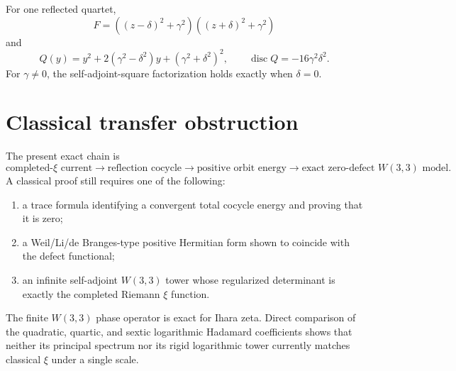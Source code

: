 For one reflected quartet,
\[
 F=((z-\delta)^2+\gamma^2)((z+\delta)^2+\gamma^2)
\]
and
\[
 Q(y)=y^2+2(\gamma^2-\delta^2)y+(\gamma^2+\delta^2)^2,
 \qquad
 \operatorname{disc}Q=-16\gamma^2\delta^2.
\]
For $\gamma\ne0$, the self-adjoint-square factorization holds exactly when
$\delta=0$.

\section{Classical transfer obstruction}

The present exact chain is
\[
 \text{completed-}\xi\text{ current}
 \longrightarrow
 \text{reflection cocycle}
 \longrightarrow
 \text{positive orbit energy}
 \longrightarrow
 \text{exact zero-defect }W(3,3)\text{ model}.
\]
A classical proof still requires one of the following:

\begin{enumerate}
  \item a trace formula identifying a convergent total cocycle energy and
        proving that it is zero;
  \item a Weil/Li/de Branges-type positive Hermitian form shown to coincide
        with the defect functional;
  \item an infinite self-adjoint $W(3,3)$ tower whose regularized determinant
        is exactly the completed Riemann $\xi$ function.
\end{enumerate}

The finite $W(3,3)$ phase operator is exact for Ihara zeta.  Direct comparison
of the quadratic, quartic, and sextic logarithmic Hadamard coefficients shows
that neither its principal spectrum nor its rigid logarithmic tower currently
matches classical $\xi$ under a single scale.
